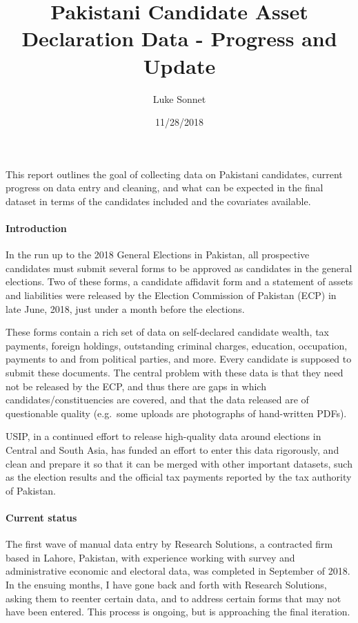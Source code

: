 \documentclass[]{article}
\title{Pakistani Candidate Asset Declaration Data - Progress and Update}
\author{Luke Sonnet}
\date{11/28/2018}
\let\oldparagraph\paragraph
\renewcommand{\paragraph}[1]{\oldparagraph{#1}\mbox{}}
\begin{document}
\maketitle

This report outlines the goal of collecting data on Pakistani
candidates, current progress on data entry and cleaning, and what can be
expected in the final dataset in terms of the candidates included and
the covariates available.

\paragraph{Introduction}\label{introduction}

In the run up to the 2018 General Elections in Pakistan, all prospective
candidates must submit several forms to be approved as candidates in the
general elections. Two of these forms, a candidate affidavit form and a
statement of assets and liabilities were released by the Election
Commission of Pakistan (ECP) in late June, 2018, just under a month
before the elections.

These forms contain a rich set of data on self-declared candidate
wealth, tax payments, foreign holdings, outstanding criminal charges,
education, occupation, payments to and from political parties, and more.
Every candidate is supposed to submit these documents. The central
problem with these data is that they need not be released by the ECP,
and thus there are gaps in which candidates/constituencies are covered,
and that the data released are of questionable quality (e.g.~some
uploads are photographs of hand-written PDFs).

USIP, in a continued effort to release high-quality data around
elections in Central and South Asia, has funded an effort to enter this
data rigorously, and clean and prepare it so that it can be merged with
other important datasets, such as the election results and the official
tax payments reported by the tax authority of Pakistan.

\paragraph{Current status}\label{current-status}

The first wave of manual data entry by Research Solutions, a contracted
firm based in Lahore, Pakistan, with experience working with survey and
administrative economic and electoral data, was completed in September
of 2018. In the ensuing months, I have gone back and forth with Research
Solutions, asking them to reenter certain data, and to address certain
forms that may not have been entered. This process is ongoing, but is
approaching the final iteration.
\end{document}
